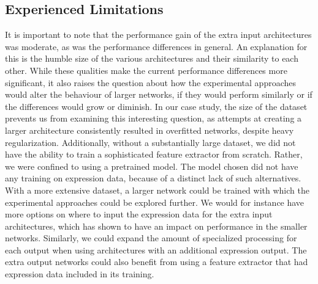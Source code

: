\subsection{Experienced Limitations}

It is important to note that the performance gain of the extra input architectures was moderate, as was the performance differences in general. An explanation for this is the humble size of the various architectures and their similarity to each other. While these qualities make the current performance differences more significant, it also raises the question about how the experimental approaches would alter the behaviour of larger networks, if they would perform similarly or if the differences would grow or diminish. In our case study, the size of the dataset prevents us from examining this interesting question, as attempts at creating a larger architecture consistently resulted in overfitted networks, despite heavy regularization. Additionally, without a substantially large dataset, we did not have the ability to train a sophisticated feature extractor from scratch. Rather, we were confined to using a pretrained model. The model chosen did not have any training on expression data, because of a distinct lack of such alternatives. \\

\noindent With a more extensive dataset, a larger network could be trained with which the experimental approaches could be explored further. We would for instance have more options on where to input the expression data for the extra input architectures, which has shown to have an impact on performance in the smaller networks. Similarly, we could expand the amount of specialized processing for each output when using architectures with an additional expression output. The extra output networks could also benefit from using a feature extractor that had expression data included in its training.


\cleardoublepage